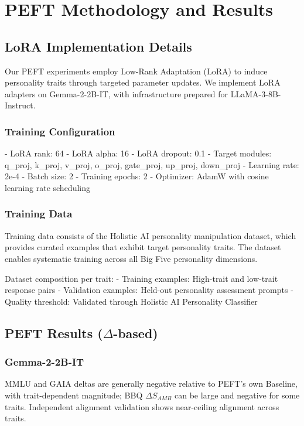 \section{PEFT Methodology and Results}
\label{app:peft}

\subsection{LoRA Implementation Details}

Our PEFT experiments employ Low-Rank Adaptation (LoRA) to induce personality traits through targeted parameter updates. We implement LoRA adapters on Gemma-2-2B-IT, with infrastructure prepared for LLaMA-3-8B-Instruct.

\subsubsection{Training Configuration}
- LoRA rank: 64
- LoRA alpha: 16
- LoRA dropout: 0.1
- Target modules: q\_proj, k\_proj, v\_proj, o\_proj, gate\_proj, up\_proj, down\_proj
- Learning rate: 2e-4
- Batch size: 2
- Training epochs: 2
- Optimizer: AdamW with cosine learning rate scheduling

\subsubsection{Training Data}

Training data consists of the Holistic AI personality manipulation dataset, which provides curated examples that exhibit target personality traits. The dataset enables systematic training across all Big Five personality dimensions.

Dataset composition per trait:
- Training examples: High-trait and low-trait response pairs
- Validation examples: Held-out personality assessment prompts
- Quality threshold: Validated through Holistic AI Personality Classifier

\subsection{PEFT Results (\(\Delta\)-based)}

\subsubsection{Gemma-2-2B-IT}
MMLU and GAIA deltas are generally negative relative to PEFT's own Baseline, with trait-dependent magnitude; BBQ \(\Delta S_{AMB}\) can be large and negative for some traits. Independent alignment validation shows near-ceiling alignment across traits.

